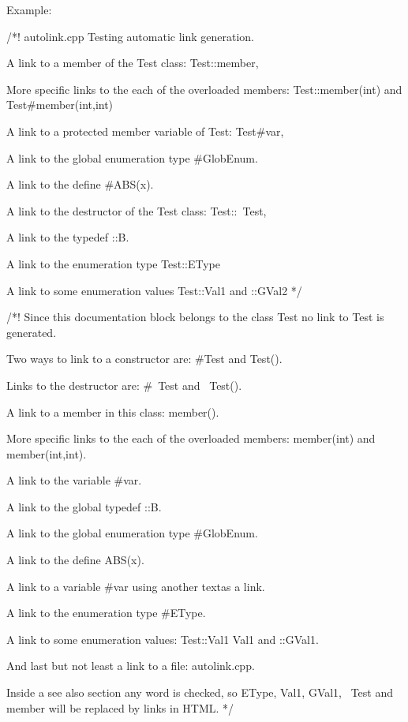 \begin{DoxyParagraph}{Example:}

\begin{DoxyVerbInclude}
/*! \file autolink.cpp
  Testing automatic link generation.
  
  A link to a member of the Test class: Test::member, 
  
  More specific links to the each of the overloaded members:
  Test::member(int) and Test#member(int,int)

  A link to a protected member variable of Test: Test#var, 

  A link to the global enumeration type #GlobEnum.
 
  A link to the define #ABS(x).
  
  A link to the destructor of the Test class: Test::~Test, 
  
  A link to the typedef ::B.
 
  A link to the enumeration type Test::EType
  
  A link to some enumeration values Test::Val1 and ::GVal2
*/

/*!
  Since this documentation block belongs to the class Test no link to 
  Test is generated.

  Two ways to link to a constructor are: #Test and Test().

  Links to the destructor are: #~Test and ~Test().
  
  A link to a member in this class: member().

  More specific links to the each of the overloaded members: 
  member(int) and member(int,int). 
  
  A link to the variable #var.

  A link to the global typedef ::B.

  A link to the global enumeration type #GlobEnum.
  
  A link to the define ABS(x).
  
  A link to a variable \link #var using another text\endlink as a link.
  
  A link to the enumeration type #EType.

  A link to some enumeration values: \link Test::Val1 Val1 \endlink and ::GVal1.

  And last but not least a link to a file: autolink.cpp.
  
  \sa Inside a see also section any word is checked, so EType, 
      Val1, GVal1, ~Test and member will be replaced by links in HTML.
*/


\end{DoxyVerbInclude}
\end{DoxyParagraph}

